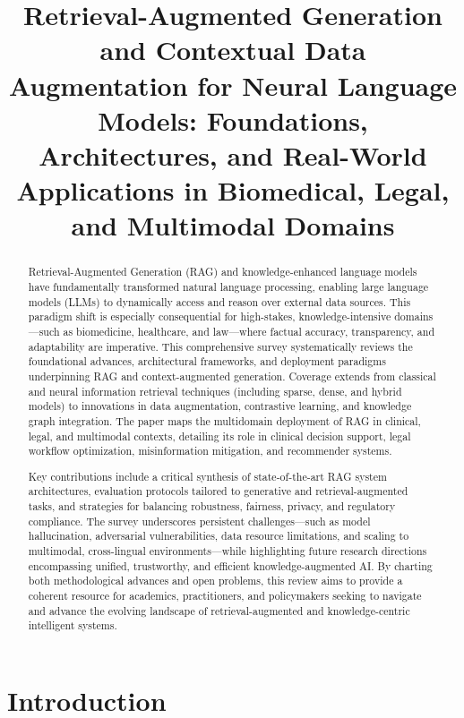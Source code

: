 \title{Retrieval-Augmented Generation and Contextual Data Augmentation for Neural Language Models: Foundations, Architectures, and Real-World Applications in Biomedical, Legal, and Multimodal Domains}
\maketitle

\begin{abstract}
Retrieval-Augmented Generation (RAG) and knowledge-enhanced language models have fundamentally transformed natural language processing, enabling large language models (LLMs) to dynamically access and reason over external data sources. This paradigm shift is especially consequential for high-stakes, knowledge-intensive domains—such as biomedicine, healthcare, and law—where factual accuracy, transparency, and adaptability are imperative. This comprehensive survey systematically reviews the foundational advances, architectural frameworks, and deployment paradigms underpinning RAG and context-augmented generation. Coverage extends from classical and neural information retrieval techniques (including sparse, dense, and hybrid models) to innovations in data augmentation, contrastive learning, and knowledge graph integration. The paper maps the multidomain deployment of RAG in clinical, legal, and multimodal contexts, detailing its role in clinical decision support, legal workflow optimization, misinformation mitigation, and recommender systems.

Key contributions include a critical synthesis of state-of-the-art RAG system architectures, evaluation protocols tailored to generative and retrieval-augmented tasks, and strategies for balancing robustness, fairness, privacy, and regulatory compliance. The survey underscores persistent challenges—such as model hallucination, adversarial vulnerabilities, data resource limitations, and scaling to multimodal, cross-lingual environments—while highlighting future research directions encompassing unified, trustworthy, and efficient knowledge-augmented AI. By charting both methodological advances and open problems, this review aims to provide a coherent resource for academics, practitioners, and policymakers seeking to navigate and advance the evolving landscape of retrieval-augmented and knowledge-centric intelligent systems.
\end{abstract}

\section{Introduction}

